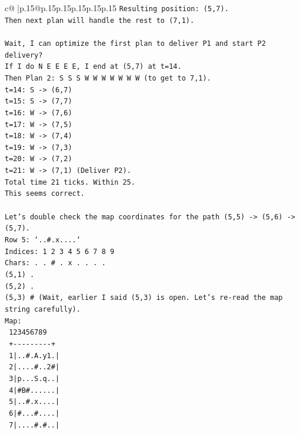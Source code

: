 \documentclass{article}
\begin{document}
{\begin{supertabular}{c@{$\;$}|p{.15\linewidth}@{}p{.15\linewidth}p{.15\linewidth}p{.15\linewidth}p{.15\linewidth}p{.15\linewidth}}
{{{\texttt{Resulting position: (5,7).} \\
\texttt{Then next plan will handle the rest to (7,1).} \\
\\ 
\texttt{Wait, I can optimize the first plan to deliver P1 and start P2 delivery?} \\
\texttt{If I do N E E E E, I end at (5,7) at t=14.} \\
\texttt{Then Plan 2: S S S W W W W W W W (to get to 7,1).} \\
\texttt{t=14: S {-}> (6,7)} \\
\texttt{t=15: S {-}> (7,7)} \\
\texttt{t=16: W {-}> (7,6)} \\
\texttt{t=17: W {-}> (7,5)} \\
\texttt{t=18: W {-}> (7,4)} \\
\texttt{t=19: W {-}> (7,3)} \\
\texttt{t=20: W {-}> (7,2)} \\
\texttt{t=21: W {-}> (7,1) (Deliver P2).} \\
\texttt{Total time 21 ticks. Within 25.} \\
\texttt{This seems correct.} \\
\\ 
\texttt{Let's double check the map coordinates for the path (5,5) {-}> (5,6) {-}> (5,7).} \\
\texttt{Row 5: `..\#.x....`} \\
\texttt{Indices: 1 2 3 4 5 6 7 8 9} \\
\texttt{Chars: . . \# . x . . . .} \\
\texttt{(5,1) .} \\
\texttt{(5,2) .} \\
\texttt{(5,3) \# (Wait, earlier I said (5,3) is open. Let's re{-}read the map string carefully).} \\
\texttt{Map:} \\
\texttt{  123456789} \\
\texttt{  +{-}{-}{-}{-}{-}{-}{-}{-}{-}+} \\
\texttt{ 1|..\#.A.y1.|} \\
\texttt{ 2|....\#..2\#|} \\
\texttt{ 3|p...S.q..|} \\
\texttt{ 4|\#B\#......|} \\
\texttt{ 5|..\#.x....|} \\
\texttt{ 6|\#...\#....|} \\
\texttt{ 7|....\#.\#..|} \\
}}}
\end{supertabular}}
\end{document}
